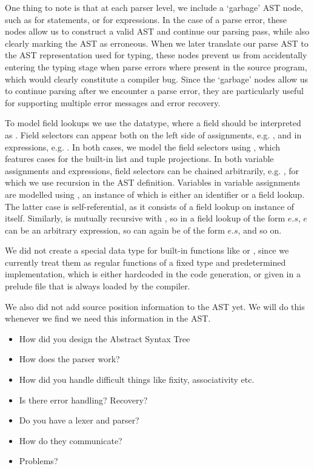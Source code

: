 One thing to note is that at each parser level, we include a `garbage' AST node,
such as  for statements, or  for
expressions. In the case of a parse error, these nodes allow us to construct a
valid AST and continue our parsing pass, while also clearly marking the AST as
erroneous. When we later translate our parse AST to the AST representation used
for typing, these nodes prevent us from accidentally entering the typing stage
when parse errors where present in the source program, which would clearly
constitute a compiler bug.
Since the `garbage' nodes allow us to continue parsing after we encounter a
parse error, they are particularly useful for supporting multiple error messages
and error recovery.

To model field lookups we use the  datatype, where a field
 should be interpreted as .
Field selectors can appear both on the left side of assignments, e.g.
, and in expressions, e.g. . In both cases, we
model the field selectors using , which features cases for the
built-in list and tuple projections.
In both variable assignments and expressions, field selectors can be chained
arbitrarily, e.g. , for which we use recursion in the AST
definition.
Variables in variable assignments are modelled using , an
instance of which is either an identifier or a field lookup. The latter case is
self-referential, as it consists of a field lookup on instance of
 itself.
Similarly,  is mutually recursive with , so in
a field lookup of the form $e.s$, $e$ can be an arbitrary expression, so can
again be of the form $e.s$, and so on.

We did not create a special data type for built-in functions like
 or , since we currently treat them as regular functions
of a fixed type and predetermined implementation, which is either hardcoded in
the code generation, or given in a prelude file that is always loaded by the
compiler.




We also did not add source position information to the AST yet.
We will do this whenever we find we need this information in the AST.

\begin{itemize}
	\item How did you design the Abstract Syntax Tree
	\item How does the parser work?
	\item How did you handle difficult things like fixity, associativity etc.
	\item Is there error handling? Recovery?
	\item Do you have a lexer and parser?
	\item How do they communicate?
	\item Problems?
\end{itemize}
